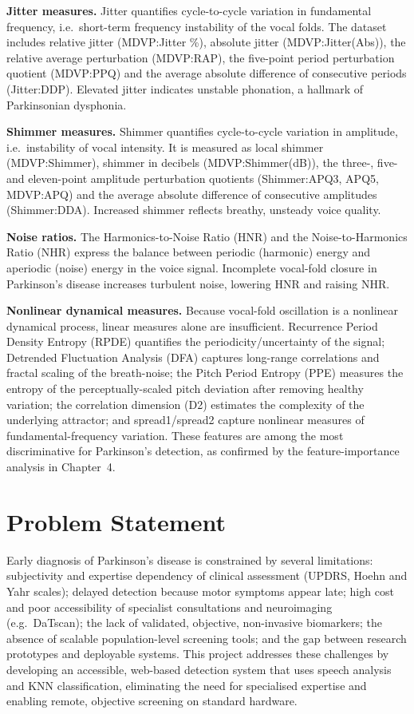 \documentclass[oneside,a4paper,12pt]{report}
\begin{document}
\textbf{Jitter measures.} Jitter quantifies cycle-to-cycle variation in fundamental
frequency, i.e.\ short-term frequency instability of the vocal folds. The dataset
includes relative jitter (MDVP:Jitter \%), absolute jitter (MDVP:Jitter(Abs)),
the relative average perturbation (MDVP:RAP), the five-point period perturbation
quotient (MDVP:PPQ) and the average absolute difference of consecutive periods
(Jitter:DDP). Elevated jitter indicates unstable phonation, a hallmark of
Parkinsonian dysphonia.

\textbf{Shimmer measures.} Shimmer quantifies cycle-to-cycle variation in
amplitude, i.e.\ instability of vocal intensity. It is measured as local shimmer
(MDVP:Shimmer), shimmer in decibels (MDVP:Shimmer(dB)), the three-, five- and
eleven-point amplitude perturbation quotients (Shimmer:APQ3, APQ5, MDVP:APQ) and
the average absolute difference of consecutive amplitudes (Shimmer:DDA). Increased
shimmer reflects breathy, unsteady voice quality.

\textbf{Noise ratios.} The Harmonics-to-Noise Ratio (HNR) and the Noise-to-Harmonics
Ratio (NHR) express the balance between periodic (harmonic) energy and aperiodic
(noise) energy in the voice signal. Incomplete vocal-fold closure in Parkinson's
disease increases turbulent noise, lowering HNR and raising NHR.

\textbf{Nonlinear dynamical measures.} Because vocal-fold oscillation is a nonlinear
dynamical process, linear measures alone are insufficient. Recurrence Period
Density Entropy (RPDE) quantifies the periodicity/uncertainty of the signal;
Detrended Fluctuation Analysis (DFA) captures long-range correlations and fractal
scaling of the breath-noise; the Pitch Period Entropy (PPE) measures the entropy of
the perceptually-scaled pitch deviation after removing healthy variation; the
correlation dimension (D2) estimates the complexity of the underlying attractor;
and spread1/spread2 capture nonlinear measures of fundamental-frequency variation.
These features are among the most discriminative for Parkinson's detection, as
confirmed by the feature-importance analysis in Chapter~4.

\section{Problem Statement}
Early diagnosis of Parkinson's disease is constrained by several limitations:
subjectivity and expertise dependency of clinical assessment (UPDRS, Hoehn and
Yahr scales); delayed detection because motor symptoms appear late; high cost and
poor accessibility of specialist consultations and neuroimaging (e.g.\ DaTscan);
the lack of validated, objective, non-invasive biomarkers; the absence of
scalable population-level screening tools; and the gap between research
prototypes and deployable systems. This project addresses these challenges by
developing an accessible, web-based detection system that uses speech analysis
and KNN classification, eliminating the need for specialised expertise and
enabling remote, objective screening on standard hardware.
\end{document}
